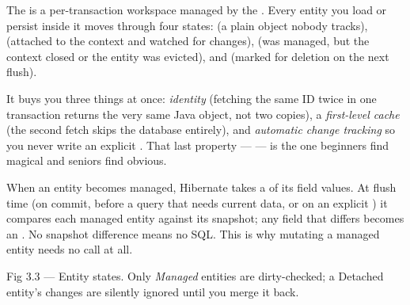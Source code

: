 

 The  is a per-transaction workspace managed by the . Every entity you load or persist inside it moves through four states:  (a plain  object nobody tracks),  (attached to the context and watched for changes),  (was managed, but the context closed or the entity was evicted), and  (marked for deletion on the next flush).

 It buys you three things at once: \emph{identity} (fetching the same ID twice in one transaction returns the very same Java object, not two copies), a \emph{first-level cache} (the second fetch skips the database entirely), and \emph{automatic change tracking} so you never write an explicit . That last property ---  --- is the one beginners find magical and seniors find obvious.

 When an entity becomes managed, Hibernate takes a  of its field values. At flush time (on commit, before a query that needs current data, or on an explicit ) it compares each managed entity against its snapshot; any field that differs becomes an . No snapshot difference means no SQL. This is why mutating a managed entity needs no  call at all.

\begin{wbfigure}{Fig 3.3 — Entity states. Only \emph{Managed} entities are dirty-checked; a Detached entity's changes are silently ignored until you merge it back.}
\end{wbfigure}

